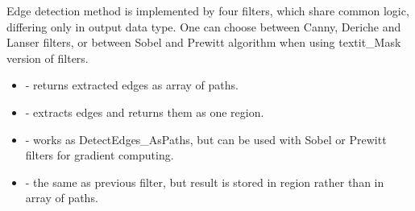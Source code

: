 \begin{refImpl}
Edge detection method is implemented by four \studio filters, which share common logic, differing only in output data type. One can choose between Canny, Deriche and Lanser filters, or between Sobel and Prewitt algorithm when using textit{\_Mask} version of filters.
\begin{itemize}
	 \item {} - returns extracted edges as array of paths.
	 \item {} - extracts edges and returns them as one region.
	 \item {} - works as DetectEdges\_AsPaths, but can be used with Sobel or Prewitt filters for gradient computing.
	 \item {} - the same as previous filter, but result is stored in region rather than in array of paths.
\end{itemize}
\end{refImpl}
